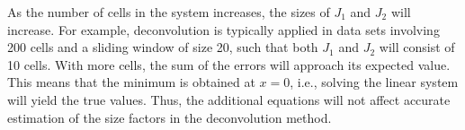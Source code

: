 \documentclass{article}
\begin{document}
As the number of cells in the system increases, the sizes of $J_1$ and $J_2$ will increase. 
For example, deconvolution is typically applied in data sets involving 200 cells and a sliding window of size 20, such that both $J_1$ and $J_2$ will consist of 10 cells.
With more cells, the sum of the errors will approach its expected value.
This means that the minimum is obtained at $x=0$, i.e., solving the linear system will yield the true values.
Thus, the additional equations will not affect accurate estimation of the size factors in the deconvolution method.
\end{document}
